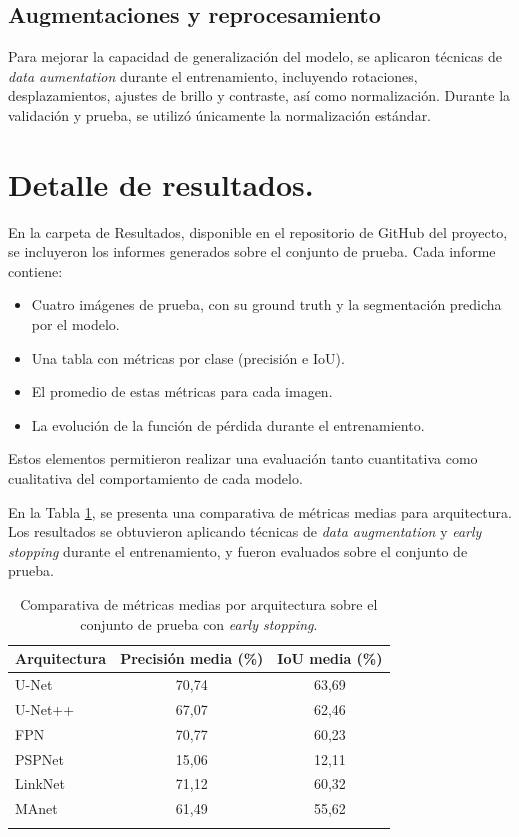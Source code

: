\subsection{Augmentaciones y reprocesamiento}
Para mejorar la capacidad de generalización del modelo, se aplicaron técnicas de \textit{data aumentation} durante el entrenamiento, incluyendo rotaciones, desplazamientos, ajustes de brillo y contraste, así como normalización. Durante la validación y prueba, se utilizó únicamente la normalización estándar.

\section{Detalle de resultados.}
En la carpeta de Resultados, disponible en el repositorio de GitHub del proyecto, se incluyeron los informes generados sobre el conjunto de prueba. Cada informe contiene:
\begin{itemize}
    \item Cuatro imágenes de prueba, con su ground truth y la segmentación predicha por el modelo.
    \item Una tabla con métricas por clase (precisión e IoU).
    \item El promedio de estas métricas para cada imagen.
    \item La evolución de la función de pérdida durante el entrenamiento.
\end{itemize}

Estos elementos permitieron realizar una evaluación tanto cuantitativa como cualitativa del comportamiento de cada modelo.

En la Tabla \ref{tab:resultados_earlystopping}, se presenta una comparativa de métricas medias para arquitectura. Los resultados se obtuvieron aplicando técnicas de \textit{data augmentation} y \textit{early stopping} durante el entrenamiento, y fueron evaluados sobre el conjunto de prueba. 

\begin{table}[h]
    \centering
    \begin{tabular}{lcc}
    \textbf{Arquitectura} & \textbf{Precisión media (\%)} & \textbf{IoU media (\%)} \\
    \hline
    U-Net             & 70,74 & 63,69\\
    U-Net++           & 67,07 & 62,46\\
    FPN               & 70,77 & 60,23\\
    PSPNet            & 15,06 & 12,11\\
    LinkNet           & 71,12 & 60,32\\
    MAnet             & 61,49 & 55,62\\
    \hfill
    \end{tabular}
    \caption{Comparativa de métricas medias por arquitectura sobre el conjunto de prueba con \textit{early stopping}.} \label{tab:resultados_earlystopping}
\end{table}

